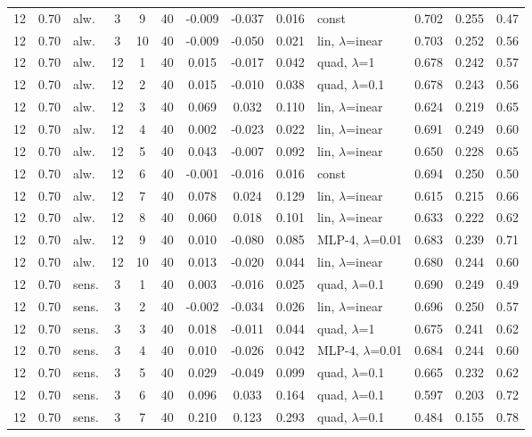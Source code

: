 \documentclass[10pt]{article}
\begin{document}
\begin{scriptsize}
\begin{longtable}{cclcc c ccc l ccc}
12 & 0.70 & alw. & 3 & 9 & 40 & -0.009 & -0.037 & 0.016 & const & 0.702 & 0.255 & 0.47 \\
12 & 0.70 & alw. & 3 & 10 & 40 & -0.009 & -0.050 & 0.021 & lin, $\lambda$=inear & 0.703 & 0.252 & 0.56 \\
12 & 0.70 & alw. & 12 & 1 & 40 & 0.015 & -0.017 & 0.042 & quad, $\lambda$=1 & 0.678 & 0.242 & 0.57 \\
12 & 0.70 & alw. & 12 & 2 & 40 & 0.015 & -0.010 & 0.038 & quad, $\lambda$=0.1 & 0.678 & 0.243 & 0.56 \\
12 & 0.70 & alw. & 12 & 3 & 40 & 0.069 & 0.032 & 0.110 & lin, $\lambda$=inear & 0.624 & 0.219 & 0.65 \\
12 & 0.70 & alw. & 12 & 4 & 40 & 0.002 & -0.023 & 0.022 & lin, $\lambda$=inear & 0.691 & 0.249 & 0.60 \\
12 & 0.70 & alw. & 12 & 5 & 40 & 0.043 & -0.007 & 0.092 & lin, $\lambda$=inear & 0.650 & 0.228 & 0.65 \\
12 & 0.70 & alw. & 12 & 6 & 40 & -0.001 & -0.016 & 0.016 & const & 0.694 & 0.250 & 0.50 \\
12 & 0.70 & alw. & 12 & 7 & 40 & 0.078 & 0.024 & 0.129 & lin, $\lambda$=inear & 0.615 & 0.215 & 0.66 \\
12 & 0.70 & alw. & 12 & 8 & 40 & 0.060 & 0.018 & 0.101 & lin, $\lambda$=inear & 0.633 & 0.222 & 0.62 \\
12 & 0.70 & alw. & 12 & 9 & 40 & 0.010 & -0.080 & 0.085 & MLP-4, $\lambda$=0.01 & 0.683 & 0.239 & 0.71 \\
12 & 0.70 & alw. & 12 & 10 & 40 & 0.013 & -0.020 & 0.044 & lin, $\lambda$=inear & 0.680 & 0.244 & 0.60 \\
12 & 0.70 & sens. & 3 & 1 & 40 & 0.003 & -0.016 & 0.025 & quad, $\lambda$=0.1 & 0.690 & 0.249 & 0.49 \\
12 & 0.70 & sens. & 3 & 2 & 40 & -0.002 & -0.034 & 0.026 & lin, $\lambda$=inear & 0.696 & 0.250 & 0.57 \\
12 & 0.70 & sens. & 3 & 3 & 40 & 0.018 & -0.011 & 0.044 & quad, $\lambda$=1 & 0.675 & 0.241 & 0.62 \\
12 & 0.70 & sens. & 3 & 4 & 40 & 0.010 & -0.026 & 0.042 & MLP-4, $\lambda$=0.01 & 0.684 & 0.244 & 0.60 \\
12 & 0.70 & sens. & 3 & 5 & 40 & 0.029 & -0.049 & 0.099 & quad, $\lambda$=0.1 & 0.665 & 0.232 & 0.62 \\
12 & 0.70 & sens. & 3 & 6 & 40 & 0.096 & 0.033 & 0.164 & quad, $\lambda$=0.1 & 0.597 & 0.203 & 0.72 \\
12 & 0.70 & sens. & 3 & 7 & 40 & 0.210 & 0.123 & 0.293 & quad, $\lambda$=0.1 & 0.484 & 0.155 & 0.78 \\

\end{longtable}
\end{scriptsize}
\end{document}
